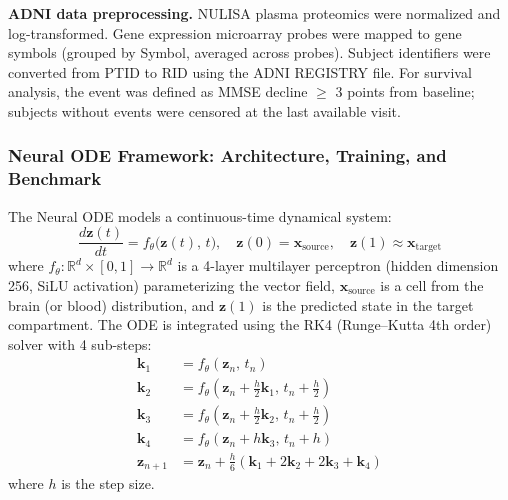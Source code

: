 \documentclass[12pt,a4paper]{article}
\begin{document}
\textbf{ADNI data preprocessing.} NULISA plasma proteomics were normalized and log-transformed. Gene expression microarray probes were mapped to gene symbols (grouped by Symbol, averaged across probes). Subject identifiers were converted from PTID to RID using the ADNI REGISTRY file. For survival analysis, the event was defined as MMSE decline $\geq$ 3 points from baseline; subjects without events were censored at the last available visit.

\subsubsection{Neural ODE Framework: Architecture, Training, and Benchmark}

The Neural ODE models a continuous-time dynamical system:
\begin{equation}
\frac{d\mathbf{z}(t)}{dt} = f_\theta\bigl(\mathbf{z}(t),\, t\bigr), \quad \mathbf{z}(0) = \mathbf{x}_{\text{source}}, \quad \mathbf{z}(1) \approx \mathbf{x}_{\text{target}}
\end{equation}
where $f_\theta: \mathbb{R}^d \times [0,1] \to \mathbb{R}^d$ is a 4-layer multilayer perceptron (hidden dimension 256, SiLU activation) parameterizing the vector field, $\mathbf{x}_{\text{source}}$ is a cell from the brain (or blood) distribution, and $\mathbf{z}(1)$ is the predicted state in the target compartment. The ODE is integrated using the RK4 (Runge--Kutta 4th order) solver with 4 sub-steps:
\begin{align}
\mathbf{k}_1 &= f_\theta(\mathbf{z}_n,\, t_n) \\
\mathbf{k}_2 &= f_\theta(\mathbf{z}_n + \tfrac{h}{2}\mathbf{k}_1,\, t_n + \tfrac{h}{2}) \\
\mathbf{k}_3 &= f_\theta(\mathbf{z}_n + \tfrac{h}{2}\mathbf{k}_2,\, t_n + \tfrac{h}{2}) \\
\mathbf{k}_4 &= f_\theta(\mathbf{z}_n + h\mathbf{k}_3,\, t_n + h) \\
\mathbf{z}_{n+1} &= \mathbf{z}_n + \tfrac{h}{6}(\mathbf{k}_1 + 2\mathbf{k}_2 + 2\mathbf{k}_3 + \mathbf{k}_4)
\end{align}
where $h$ is the step size.
\end{document}
